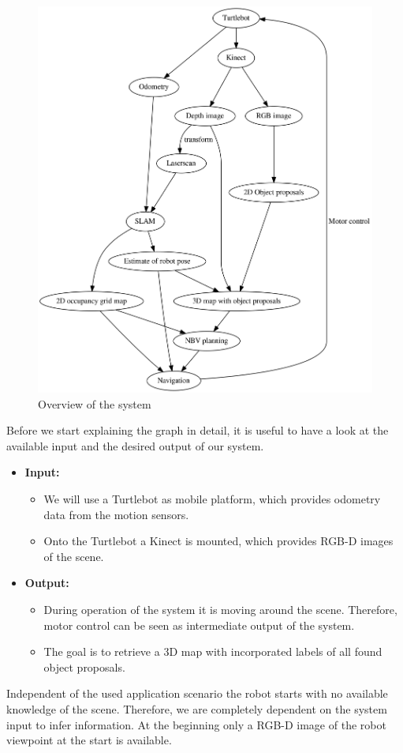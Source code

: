 \documentclass[a4paper,11pt,english]{article}
\begin{document}
\begin{figure}
	\begin{center}
		\includegraphics[width=1\linewidth]{dot/overview.png} 
		\caption{Overview of the system}
		\label{fig:overview}
	\end{center}
\end{figure}

Before we start explaining the graph in detail, it is useful to have a look at the available input and the desired output of our system.
\begin{itemize}
	\item \textbf{Input:}
	\begin{itemize}
		\item We will use a Turtlebot as mobile platform, which provides odometry data from the motion sensors.
		\item Onto the Turtlebot a Kinect is mounted, which provides RGB-D images of the scene.
	\end{itemize}
	\item \textbf{Output:}
	\begin{itemize}
		\item During operation of the system it is moving around the scene. Therefore, motor control can be seen as intermediate output of the system.
		\item The goal is to retrieve a 3D map with incorporated labels of all found object proposals.
	\end{itemize}  
\end{itemize}
Independent of the used application scenario the robot starts with no available knowledge of the scene.
Therefore, we are completely dependent on the system input to infer information.
At the beginning only a RGB-D image of the robot viewpoint at the start is available.
\end{document}
